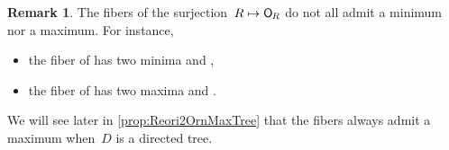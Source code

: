 \documentclass{amsart}
\theoremstyle{definition}
\newtheorem{remark}[theorem]{Remark}
\newcommand{\mymap}[2]{\mathsf{#1}_{\hspace{-.7pt}#2}}
\newcommand{\orn}[1]{\mymap{O}{#1}}  %
\begin{document}
\begin{remark}
\label{rem:Reori2OrnIntervals1}
The fibers of the surjection~$R \mapsto \orn{R}$ do not all admit a minimum nor a maximum.
For instance, 
\begin{itemize}
\item the fiber of  has two minima \!\!\!\! and \!\!\!\!\!\!,
\item the fiber of  has two maxima \!\!\!\! and \!\!\!\!\!\!.
\end{itemize}
We will see later in \cref{prop:Reori2OrnMaxTree} that the fibers always admit a maximum when~$D$ is a directed tree.
\end{remark}
\end{document}
